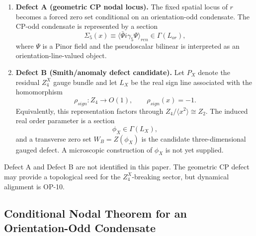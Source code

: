 \documentclass[11pt]{article}
\theoremstyle{canonmath}
\theoremstyle{canonpostulate}
\theoremstyle{canonclaim}
\providecommand{\Lor}{\mathcal L_{\mathrm{or}}}
\def\mathrm#1{#1}%
\def\mathbb#1{#1}%
\def\mathcal#1{#1}%
\begin{document}
\begin{enumerate}
\item \textbf{Defect A (geometric CP nodal locus).} The fixed spatial locus of $r$ becomes a forced zero set conditional on an orientation-odd condensate. The CP-odd condensate is represented by a section
\begin{equation}
\Sigma_5(x)
\equiv
\langle\bar\Psi i\gamma_5\Psi\rangle_{\mathrm{ren}}
\in\Gamma(\Lor),
\end{equation}
where $\Psi$ is a Pinor field and the pseudoscalar bilinear is interpreted as an orientation-line-valued object.

\item \textbf{Defect B (Smith/anomaly defect candidate).} Let $P_X$ denote the residual $\mathbb Z_4^X$ gauge bundle and let $L_X$ be the real sign line associated with the homomorphism
\begin{equation}
\rho_{\mathrm{sign}}:\mathbb Z_4\longrightarrow O(1),
\qquad
\rho_{\mathrm{sign}}(x)=-1.
\end{equation}
Equivalently, this representation factors through $\mathbb Z_4/\langle x^2\rangle\cong\mathbb Z_2$. The induced real order parameter is a section
\begin{equation}
\phi_X\in\Gamma(L_X),
\end{equation}
and a transverse zero set $W_B=Z(\phi_X)$ is the candidate three-dimensional gauged defect. A microscopic construction of $\phi_X$ is not yet supplied.
\end{enumerate}

Defect A and Defect B are not identified in this paper. The geometric CP defect may provide a topological seed for the $\mathbb Z_4^X$-breaking sector, but dynamical alignment is OP-10.

\subsection{Conditional Nodal Theorem for an Orientation-Odd Condensate}
\end{document}
